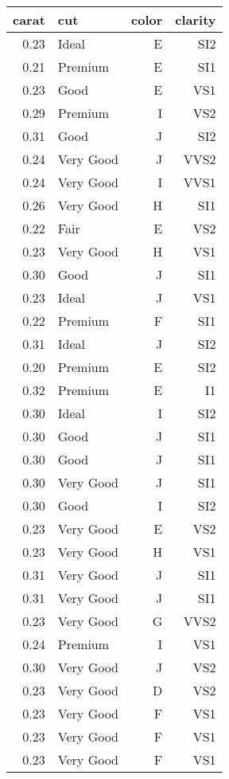 \documentclass[12pt,english,nohyper]{tufte-handout}\usepackage[]{graphicx}\usepackage[]{color}
\begin{document}
\begin{fullwidth}
\makeatletter\setlength\hsize{\@tufte@fullwidth}\makeatother
\begin{longtable}{r|lr|r}
  \hline
carat & cut & color & clarity \\ 
  \hline
0.23 & Ideal & E & SI2 \\ 
  0.21 & Premium & E & SI1 \\ 
  0.23 & Good & E & VS1 \\ 
  0.29 & Premium & I & VS2 \\ 
  0.31 & Good & J & SI2 \\ 
  0.24 & Very Good & J & VVS2 \\ 
  0.24 & Very Good & I & VVS1 \\ 
  0.26 & Very Good & H & SI1 \\ 
  0.22 & Fair & E & VS2 \\ 
  0.23 & Very Good & H & VS1 \\ 
  0.30 & Good & J & SI1 \\ 
  0.23 & Ideal & J & VS1 \\ 
  0.22 & Premium & F & SI1 \\ 
  0.31 & Ideal & J & SI2 \\ 
  0.20 & Premium & E & SI2 \\ 
  0.32 & Premium & E & I1 \\ 
  0.30 & Ideal & I & SI2 \\ 
  0.30 & Good & J & SI1 \\ 
  0.30 & Good & J & SI1 \\ 
  0.30 & Very Good & J & SI1 \\ 
  0.30 & Good & I & SI2 \\ 
  0.23 & Very Good & E & VS2 \\ 
  0.23 & Very Good & H & VS1 \\ 
  0.31 & Very Good & J & SI1 \\ 
  0.31 & Very Good & J & SI1 \\ 
  0.23 & Very Good & G & VVS2 \\ 
  0.24 & Premium & I & VS1 \\ 
  0.30 & Very Good & J & VS2 \\ 
  0.23 & Very Good & D & VS2 \\ 
  0.23 & Very Good & F & VS1 \\ 
  0.23 & Very Good & F & VS1 \\ 
  0.23 & Very Good & F & VS1 \\ 

\end{longtable}
\end{fullwidth}
\end{document}
